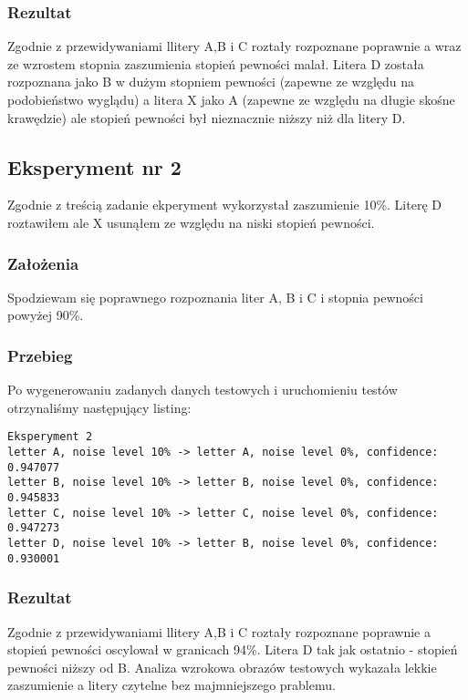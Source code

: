 \documentclass[12pt]{article}
\begin{document}
\subsubsection{Rezultat}
Zgodnie z przewidywaniami llitery A,B i C roztały rozpoznane poprawnie a wraz ze wzrostem stopnia zaszumienia stopień pewności malał. Litera D została rozpoznana jako B w dużym stopniem pewności (zapewne ze względu na podobieństwo wyglądu) a litera X jako A (zapewne ze względu na długie skośne krawędzie) ale stopień pewności był nieznacznie niższy niż dla litery D.\\

\subsection{Eksperyment nr 2}
Zgodnie z treścią zadanie ekperyment wykorzystał zaszumienie 10\%. Literę D roztawiłem ale X usunąłem ze względu na niski stopień pewności.

\subsubsection{Założenia}
Spodziewam się poprawnego rozpoznania liter A, B i C i stopnia pewności powyżej 90\%.\\

\subsubsection{Przebieg}
Po wygenerowaniu zadanych danych testowych i uruchomieniu testów otrzynaliśmy następujący listing:
\begin{verbatim}
Eksperyment 2
letter A, noise level 10% -> letter A, noise level 0%, confidence: 0.947077
letter B, noise level 10% -> letter B, noise level 0%, confidence: 0.945833
letter C, noise level 10% -> letter C, noise level 0%, confidence: 0.947273
letter D, noise level 10% -> letter B, noise level 0%, confidence: 0.930001
\end{verbatim}

\subsubsection{Rezultat}
Zgodnie z przewidywaniami llitery A,B i C roztały rozpoznane poprawnie a stopień pewności oscylował w granicach 94\%. Litera D tak jak ostatnio - stopień pewności niższy od B. Analiza wzrokowa obrazów testowych wykazała lekkie zaszumienie a litery czytelne bez majmniejszego prablemu.\\
\end{document}
